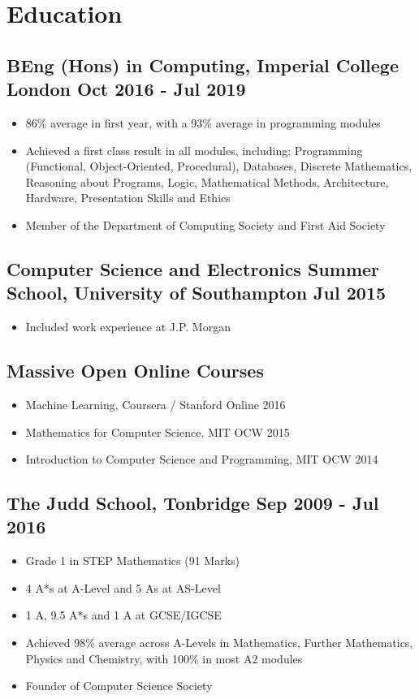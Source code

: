 \documentclass[a4paper, 8pt]{extarticle}
\begin{document}
\begin{minipage}[t]{.65\textwidth}

\section*{Education}

\subsection*{BEng (Hons) in Computing, Imperial College London \hfill Oct 2016 - Jul 2019}
\begin{itemize}
	\item 86\% average in first year, with a 93\% average in programming modules
	\item Achieved a first class result in all modules, including: Programming (Functional, Object-Oriented, Procedural), Databases, Discrete Mathematics, Reasoning about Programs, Logic, Mathematical Methods, Architecture, Hardware, Presentation Skills and Ethics
	\item Member of the Department of Computing Society and First Aid Society
\end{itemize}

\subsection*{Computer Science and Electronics Summer School, University of Southampton \hfill Jul 2015}
\begin{itemize}
	\item Included work experience at J.P. Morgan
\end{itemize}

\subsection*{Massive Open Online Courses}
\begin{itemize}
	\item Machine Learning, Coursera / Stanford Online \hfill 2016
	\item Mathematics for Computer Science, MIT OCW \hfill 2015
	\item Introduction to Computer Science and Programming, MIT OCW \hfill 2014
\end{itemize}

\subsection*{The Judd School, Tonbridge \hfill Sep 2009 - Jul 2016}
\begin{itemize}
	\item Grade 1 in STEP Mathematics (91 Marks)
	\item 4 A*s at A-Level and 5 As at AS-Level
	\item 1 A$\hat{}$, 9.5 A*s and 1 A at GCSE/IGCSE
	\item Achieved 98\% average across A-Levels in Mathematics, Further Mathematics, Physics and Chemistry, with 100\% in most A2 modules
	\item Founder of Computer Science Society
\end{itemize}



\end{minipage}
\end{document}
